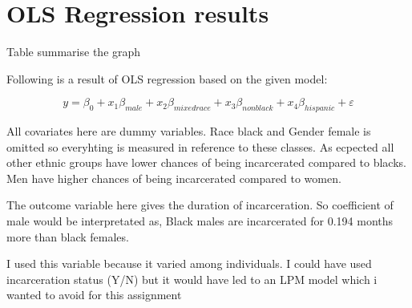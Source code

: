 \documentclass{article}
\begin{document}
\section{OLS Regression results}

Table summarise the graph



Following is a result of OLS regression based on the given model:

\begin{equation*}
    y = \beta_0 + x_1\beta_{male} + x_2\beta_{mixedrace} +x_3\beta_{nonblack} +x_4\beta_{hispanic} +\varepsilon
\end{equation*}

All covariates here are dummy variables. Race black and Gender female is omitted so everyhting is measured in reference to these classes. As ecpected all other ethnic groups have lower chances of being incarcerated compared to blacks. Men have higher chances of being incarcerated compared to women. 

The outcome variable here gives the duration of incarceration. So coefficient of male would be interpretated as, Black males are incarcerated for 0.194 months more than black females. 

I used this variable because it varied among individuals. I could have used incarceration status (Y/N) but it would have led to an LPM model which i wanted to avoid for this assignment


\end{document}
